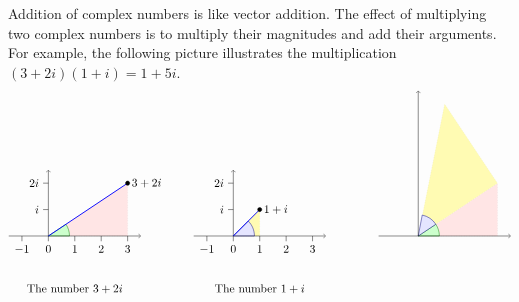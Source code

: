 Addition of complex numbers is like vector addition. The effect of
multiplying two complex numbers is to multiply their magnitudes and
add their arguments. For example, the following picture illustrates
the multiplication $(3+2i)(1+i)=1+5i$.
\begin{equation*}
  \begin{tikzpicture}[scale=0.8]
    \begin{scope}
      \draw[help lines, dotted, fill=red!10] (0,0) -- (3,0) -- (3,2) -- cycle;
      \filldraw[fill=green!20,draw=green!50!black] (0,0) -- (0.8,0) arc (0:33.69:0.8) -- cycle;
      \draw[->](-1.5,0) -- (3.5,0);
      \draw[->](0,0) -- (0,2.5);
      \draw(0,1) -- +(-0.2,0) node[left] {$i$};
      \draw(0,2) -- +(-0.2,0) node[left] {$2i$};
      \draw(-1,0) -- +(0,-0.2) node[below] {$-1$};
      \draw(0,0) -- +(0,-0.2) node[below] {$0$};
      \draw(1,0) -- +(0,-0.2) node[below] {$1$};
      \draw(2,0) -- +(0,-0.2) node[below] {$2$};
      \draw(3,0) -- +(0,-0.2) node[below] {$3$};
      \draw[thick, blue] (0,0) -- (3,2);
      \draw[fill, black] (3,2) circle [radius=2.25pt] node [right] {$3+2i$};
      \draw (1,-2) node {The number $3+2i$};
    \end{scope}
    \begin{scope}[xshift=7cm]
      \draw[help lines, dotted, fill=yellow!30] (0,0) -- (1,0) -- (1,1) -- cycle;
      \filldraw[fill=blue!10,draw=blue!50!black] (0,0) -- (0.8,0) arc (0:45:0.8) -- cycle;
      \draw[->](-1.5,0) -- (3.5,0);
      \draw[->](0,0) -- (0,2.5);
      \draw(0,1) -- +(-0.2,0) node[left] {$i$};
      \draw(0,2) -- +(-0.2,0) node[left] {$2i$};
      \draw(-1,0) -- +(0,-0.2) node[below] {$-1$};
      \draw(0,0) -- +(0,-0.2) node[below] {$0$};
      \draw(1,0) -- +(0,-0.2) node[below] {$1$};
      \draw(2,0) -- +(0,-0.2) node[below] {$2$};
      \draw(3,0) -- +(0,-0.2) node[below] {$3$};
      \draw[thick, blue] (0,0) -- (1,1);
      \draw[fill, black] (1,1) circle [radius=2.25pt] node [right] {$1+i$};
      \draw (1,-2) node {The number $1+i$};
    \end{scope}
    \begin{scope}[xshift=14cm]
      \draw[help lines, dotted, fill=red!10] (0,0) -- (3,0) -- (3,2) -- cycle;
      \draw[help lines, dotted, fill=yellow!30] (0,0) -- (3,2) -- (1,5) -- cycle;
      \filldraw[fill=green!20,draw=green!50!black] (0,0) -- (0.8,0) arc (0:33.69:0.8) -- cycle;
      \filldraw[fill=blue!10,draw=blue!50!black] (0,0) -- (33.69:0.8) arc (33:78.69:0.8) -- cycle;
      \draw[->](-1.5,0) -- (3.5,0);
      \draw[->](0,0) -- (0,5.5);

\end{scope}
\end{tikzpicture}
\end{equation*}
